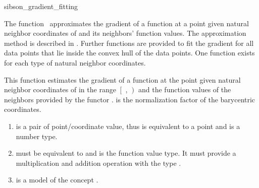 
\begin{ccRefFunction}{sibson_gradient_fitting}  %

\ccDefinition
  
The function \ccRefName\ approximates the gradient of a function at a
point  given natural neighbor coordinates of  and its
neighbors' function values. The approximation method is described in
\cite{s-bdnni-81}. Further functions are provided to fit the gradient
for all data points that lie inside the convex hull of the data
points. One function exists for each type of natural neighbor
coordinates.


 { This function estimates the
  gradient of a function at the point  given natural neighbor
  coordinates of  in the range $\left[\right.$ ,
  $\left.\right)$ and the function values of the neighbors
  provided by the functor .   is the normalization
  factor of the barycentric coordinates.}

\begin{enumerate}
\item {} is a pair of point/coordinate
  value, thus  is
  equivalent to a point and
   is a
  number type. 
\item {} must be equivalent to
   and
   is the function value type. It must
  provide a multiplication and addition operation with the type
  .
\item  {} is a model of the concept 
  .
\end{enumerate}


\end{ccRefFunction}
